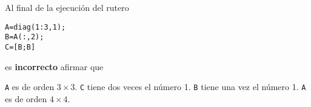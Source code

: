 \begin{pregunta}
\begin{cuerpo}
Al final de la ejecuci\'on del rutero
\begin{lstlisting}
A=diag(1:3,1);
B=A(:,2);
C=[B;B]
\end{lstlisting}
es \textbf{incorrecto} afirmar que
\end{cuerpo}

\begin{multicols}{2}
\begin{alternativas}
{\texttt{A} es de orden $3\times 3$.}
{\texttt{C} tiene dos veces el n\'umero 1.}
{\texttt{B} tiene una vez el n\'umero 1.}
{\texttt{A} es de orden $4\times 4$.}
\end{alternativas}
\end{multicols}
\justificacion{4cm}
\end{pregunta}
